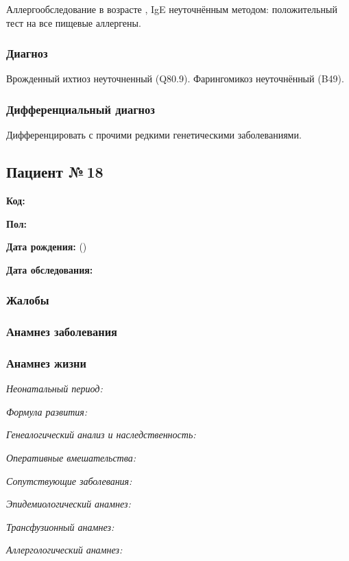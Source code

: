 \documentclass[a4paper,14pt]{extarticle}
\begin{document}
Аллергообследование в возрасте , IgE неуточнённым методом: положительный тест на все пищевые аллергены.

\subsubsection*{Диагноз}

Врожденный ихтиоз неуточненный (Q80.9). Фарингомикоз неуточнённый (B49).

\subsubsection*{Дифференциальный диагноз}

Дифференцировать с прочими редкими генетическими заболеваниями.

\newpage
\subsection*{Пациент №\,18}

\textbf{Код:} 

\textbf{Пол:}

\textbf{Дата рождения:}  ()

\textbf{Дата обследования:} 

\subsubsection*{Жалобы}

\subsubsection*{Анамнез заболевания}

\subsubsection*{Анамнез жизни}

\emph{Неонатальный период:}

\emph{Формула развития:}

\emph{Генеалогический анализ и наследственность:}

\emph{Оперативные вмешательства:}

\emph{Сопутствующие заболевания:}

\emph{Эпидемиологический анамнез:}

\emph{Трансфузионный анамнез:}

\emph{Аллергологический анамнез:}
\end{document}
